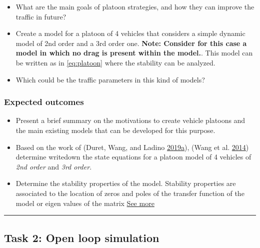 \documentclass[]{book}
\providecommand{\tightlist}{%
  \setlength{\itemsep}{0pt}\setlength{\parskip}{0pt}}
\theoremstyle{definition}
\theoremstyle{definition}
\theoremstyle{definition}
\theoremstyle{remark}
\begin{document}
\begin{itemize}
\tightlist
\item
  What are the main goals of platoon strategies, and how they can
  improve the traffic in future?
\item
  Create a model for a platoon of 4 vehicles that considers a simple
  dynamic model of 2nd order and a 3rd order one. \textbf{Note: Consider
  for this case a model in which no drag is present within the model.}.
  This model can be written as in \eqref{eq:platoon} where the stability
  can be analyzed.
\item
  Which could be the traffic parameters in this kind of models?
\end{itemize}

\hypertarget{expected-outcomes-4}{%
\subsubsection*{Expected outcomes}\label{expected-outcomes-4}}

\begin{itemize}
\tightlist
\item
  Present a brief summary on the motivations to create vehicle platoons
  and the main existing models that can be developed for this purpose.
\item
  Based on the work of (Duret, Wang, and Ladino
  \protect\hyperlink{ref-Duret2019:ISTTT}{2019}\protect\hyperlink{ref-Duret2019:ISTTT}{a}),
  (Wang et al. \protect\hyperlink{ref-Meng2014b:TR-C}{2014}) determine
  writedown the state equations for a platoon model of 4 vehicles of
  \emph{2nd order} and \emph{3rd order}.\\
\item
  Determine the stability properties of the model. Stability properties
  are associated to the location of zeros and poles of the transfer
  function of the model or eigen values of the matrix
  \href{https://en.wikipedia.org/wiki/Stability_theory}{See more}
\end{itemize}

\begin{center}\rule{0.5\linewidth}{\linethickness}\end{center}

\hypertarget{task-2-open-loop-simulation}{%
\subsection*{Task 2: Open loop
simulation}\label{task-2-open-loop-simulation}}
\end{document}
